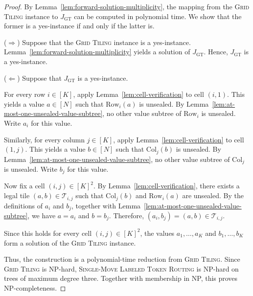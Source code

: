 \documentclass[a4paper,USenglish,thm-restate]{lipics-v2021}
\newcommand{\rowsub}{\mathrm{Row}}
\newcommand{\colsub}{\mathrm{Col}}
\theoremstyle{problemstyle}
\begin{document}
\solutionMultiplicityHardness*
\begin{proof}
By Lemma~\ref{lem:forward-solution-multiplicity}, the mapping from the \textsc{Grid Tiling} instance to $J_{\mathrm{GT}}$ can be computed in polynomial time. We show that the former is a yes-instance if and only if the latter is.

\smallskip
\noindent
($\Rightarrow$) Suppose that the \textsc{Grid Tiling} instance is a yes-instance. Lemma~\ref{lem:forward-solution-multiplicity} yields a solution of $J_{\mathrm{GT}}$. Hence, $J_{\mathrm{GT}}$ is a yes-instance.

\smallskip
\noindent
($\Leftarrow$) Suppose that $J_{\mathrm{GT}}$ is a yes-instance.

For every row $i\in[K]$, apply Lemma~\ref{lem:cell-verification} to cell $(i,1)$. This yields a value $a\in[N]$ such that $\rowsub_i(a)$ is unsealed. By Lemma~\ref{lem:at-most-one-unsealed-value-subtree}, no other value subtree of $\rowsub_i$ is unsealed. Write $a_i$ for this value.

Similarly, for every column $j\in[K]$, apply Lemma~\ref{lem:cell-verification} to cell $(1,j)$. This yields a value $b\in[N]$ such that $\colsub_j(b)$ is unsealed. By Lemma~\ref{lem:at-most-one-unsealed-value-subtree}, no other value subtree of $\colsub_j$ is unsealed. Write $b_j$ for this value.

Now fix a cell $(i,j)\in[K]^2$. By Lemma~\ref{lem:cell-verification}, there exists a legal tile $(a,b)\in \mathcal{T}_{i,j}$ such that $\colsub_j(b)$ and $\rowsub_i(a)$ are unsealed. By the definitions of $a_i$ and $b_j$, together with Lemma~\ref{lem:at-most-one-unsealed-value-subtree}, we have $a=a_i$ and $b=b_j$. Therefore, $(a_i,b_j)=(a,b)\in \mathcal{T}_{i,j}$.

Since this holds for every cell $(i,j)\in[K]^2$, the values $a_1,\ldots,a_K$ and $b_1,\ldots,b_K$ form a solution of the \textsc{Grid Tiling} instance.

Thus, the construction is a polynomial-time reduction from \textsc{Grid Tiling}. Since \textsc{Grid Tiling} is \textsf{NP}-hard, \textsc{Single-Move Labeled Token Routing} is \textsf{NP}-hard on trees of maximum degree three. Together with membership in \textsf{NP}, this proves \textsf{NP}-completeness.


\end{proof}
\end{document}
